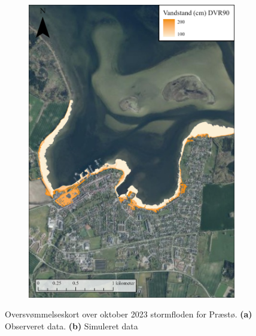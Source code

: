\begin{figure}[H]
\begin{subfigure}[t]{0.5\textwidth}
        \includegraphics[width=0.95\linewidth]{images/Resultater/2023Model/2023 model_praestoe.jpg}
        \caption{}
        \label{Subfig: Model Præstø}
    \end{subfigure}
    \caption{Oversvømmelseskort over oktober 2023 stormfloden for Præstø. \textbf{(a)} Observeret data. \textbf{(b)} Simuleret data}
    \label{Figur: Målt & simuleret Præstø}
\end{figure}

